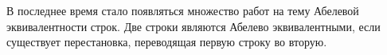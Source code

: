 
В последнее время стало появляться множество работ на тему Абелевой эквивалентности строк. Две строки являются Абелево эквивалентными, если существует перестановка, переводящая первую строку во вторую.


